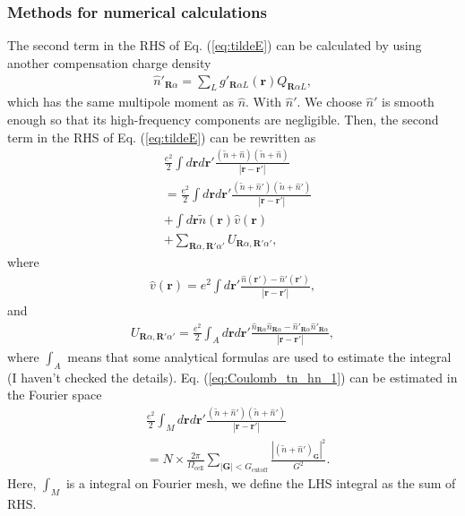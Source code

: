\documentclass{article}
\begin{document}
\subsubsection{Methods for numerical calculations}
The second term in the RHS of Eq. (\ref{eq:tildeE}) can be calculated by using another compensation charge density
\begin{align}
  \hat{n}'_{\bm{R}\alpha} = \sum_L g'_{\bm{R}\alpha L}(\bm{r}) Q_{\bm{R}\alpha L},
\end{align}
which has the same multipole moment as $\hat{n}$. With $\hat{n}'$.
We choose $\hat{n}'$ is smooth enough so that its high-frequency components are negligible. 
Then, the second term in the RHS of Eq. (\ref{eq:tildeE}) can be rewritten as 
\begin{align}
  &
\frac{e^2}{2}\int d\bm{r}d\bm{r}' \frac{(\widetilde{n} + \hat{n})(\widetilde{n} + \hat{n})}{|\bm{r}-\bm{r}'|}
\nonumber
\\&=
\frac{e^2}{2}\int d\bm{r}d\bm{r}' \frac{(\widetilde{n} + \hat{n}')(\widetilde{n} + \hat{n}')}{|\bm{r}-\bm{r}'|}
\label{eq:Coulomb_tn_hn_1}
\\&
+
\int d\bm{r} \widetilde{n} (\bm{r}) \hat{v}(\bm{r})
\label{eq:Coulomb_tn_hn_2}
\\&
+ 
\sum_{\bm{R}\alpha, \bm{R}'\alpha'} U_{\bm{R}\alpha,\bm{R}'\alpha'},
\end{align}
where
\begin{align}
  \hat{v}(\bm{r}) = e^2 \int d\bm{r}' \frac{ \hat{n}(\bm{r}') - \hat{n}'(\bm{r}')}{|\bm{r}-\bm{r}'|},
\end{align}
and
\begin{align}
  U_{\bm{R}\alpha,\bm{R}'\alpha'} 
  = \frac{e^2}{2}\int_A d\bm{r}d\bm{r}' \frac{\hat{n}_{\bm{R}\alpha}\hat{n}_{\bm{R}\alpha} - \hat{n}'_{\bm{R}\alpha} \hat{n}'_{\bm{R}\alpha}}{|\bm{r}-\bm{r}'|},
  \label{eq:U_RaRpap}
\end{align}
where $\int_A$ means that some analytical formulas are used to estimate the integral (I haven't checked the details).
Eq. (\ref{eq:Coulomb_tn_hn_1}) can be estimated in the Fourier space
\begin{align}
  &
  \frac{e^2}{2}\int_M d\bm{r}d\bm{r}' \frac{(\widetilde{n} + \hat{n}')(\widetilde{n} + \hat{n}')}{|\bm{r}-\bm{r}'|}
  \\&=
  N\times \frac{2\pi}{\Omega_{\text{cell}}} \sum_{|\bm{G}| < G_{\text{cutoff}} } \frac{|(\widetilde{n} + \hat{n}')_{\bm{G}}|^2}{G^2}.
  \label{eq:intM_Coulomb_tn_hnp}
\end{align}
Here, $\int_M$ is a integral on Fourier mesh, we define the LHS integral as the sum of RHS.
\end{document}
